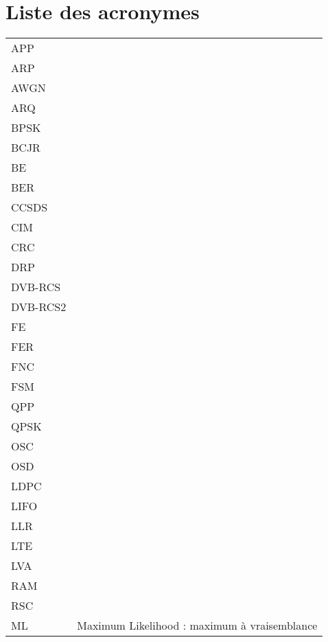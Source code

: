 \chapter*{Liste des acronymes}
\begin{center}

\begin{longtable}{ p{}  p{} } 

APP         &														\\
ARP 	  	&	 													\\
AWGN    	&	 													\\
ARQ 	   	&	 													\\
BPSK		&														\\
BCJR		&														\\
BE 			&	 													\\
BER         &														\\
CCSDS       &														\\
CIM  		&														\\
CRC 	   	&	 													\\	
DRP         &														\\
DVB-RCS    	&	 													\\
DVB-RCS2   	&	 													\\
FE 			&	 													\\
FER         &														\\
FNC         &														\\
FSM         &														\\
QPP 	   	&	 													\\
QPSK		&														\\
OSC 		&														\\
OSD 		&														\\
LDPC 	   	&	 													\\
LIFO 		&														\\
LLR  	  	&	 													\\
LTE 	   	&	 													\\
LVA	   		&	 													\\
RAM 		&														\\
RSC 		&														\\
ML          & Maximum Likelihood : maximum à vraisemblance 			\\

\end{longtable}
\end{center}
